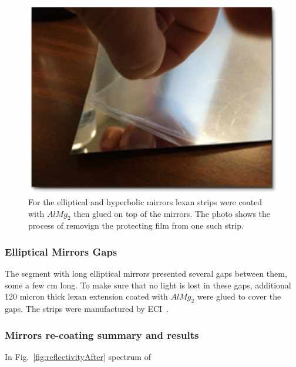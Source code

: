 \begin{figure}[h]
\centering
	\includegraphics[width=0.98\columnwidth,keepaspectratio]{img/filmOnStrip.png}
	\caption{For the elliptical and hyperbolic mirrors lexan strips were coated with $AlMg_2$ then glued on top of the mirrors. The photo shows
            the process of removign the protecting film from one such strip.}
	\label{fig:filmOnStrip}
\end{figure}


\subsubsection{Elliptical Mirrors Gaps}

The segment with long elliptical mirrors presented several gaps between them, some a few cm long. To make sure that no light is lost in these gaps,
additional 120 micron thick lexan extension coated with $AlMg_2$ were glued to cover the gaps. The strips were manufactured by ECI~\cite{ECI}.


\subsubsection{Mirrors re-coating summary and results}

In Fig.~\ref{fig:reflectivityAfter} spectrum of 

